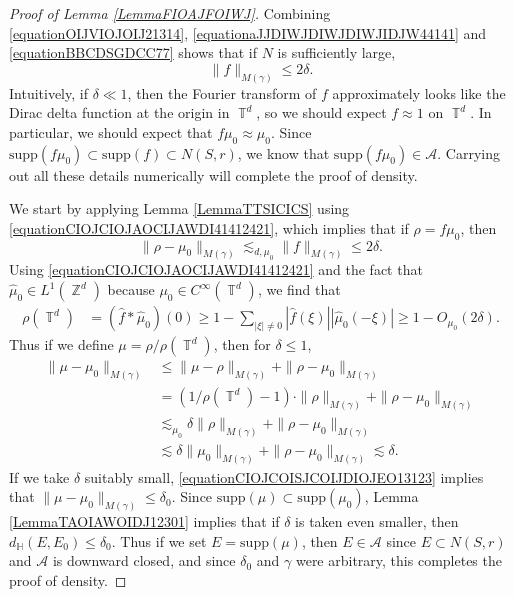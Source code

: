 \documentclass[dvipsnames,letterpaper,12pt]{article}
\numberwithin{equation}{section}
\DeclareMathOperator{\ZZ}{\mathbb{Z}}
\DeclareMathOperator{\TT}{\mathbb{T}}
\numberwithin{theorem}{section}
\begin{document}
\begin{proof}[Proof of Lemma \ref{LemmaFIOAJFOIWJ}]
    Combining \eqref{equationOIJVIOJOIJ21314}, \eqref{equationaJJDIWJDIWJDIWJIDJW44141} and \eqref{equationBBCDSGDCC77} shows that if $N$ is sufficiently large,
    \begin{equation} \label{equationCIOJCIOJAOCIJAWDI41412421}
        \| f \|_{M(\gamma)} \leq 2 \delta.
    \end{equation}
    Intuitively, if $\delta \ll 1$, then the Fourier transform of $f$ approximately looks like the Dirac delta function at the origin in $\TT^d$, so we should expect $f \approx 1$ on $\TT^d$. In particular, we should expect that $f \mu_0 \approx \mu_0$. Since $\text{supp}(f \mu_0) \subset \text{supp}(f) \subset N(S,r)$, we know that $\text{supp}(f \mu_0) \in \mathcal{A}$. Carrying out all these details numerically will complete the proof of density.

    We start by applying Lemma \ref{LemmaTTSICICS} using \eqref{equationCIOJCIOJAOCIJAWDI41412421}, which implies that if $\rho = f \mu_0$, then
    \begin{equation}
        \| \rho - \mu_0 \|_{M(\gamma)} \lesssim_{d,\mu_0} \| f \|_{M(\gamma)} \leq 2 \delta.
    \end{equation}
    Using \eqref{equationCIOJCIOJAOCIJAWDI41412421} and the fact that $\widehat{\mu}_0 \in L^1(\ZZ^d)$ because $\mu_0 \in C^\infty(\TT^d)$, we find that
    \begin{equation} \label{equationFIOJCIOWJCOIJFIO}
    \begin{split}
        \rho(\TT^d) &= (\widehat{f} * \widehat{\mu}_0)(0) \geq 1 - \sum_{|\xi| \neq 0} |\widehat{f}(\xi)| |\widehat{\mu}_0(-\xi)| \geq 1 - O_{\mu_0}(2 \delta).
    \end{split}
    \end{equation}
    Thus if we define $\mu = \rho / \rho(\TT^d)$, then for $\delta \leq 1$,
    \begin{equation} \label{equationCIOJCOISJCOIJDIOJEO13123}
    \begin{split}
        \| \mu - \mu_0 \|_{M(\gamma)} &\leq \| \mu - \rho \|_{M(\gamma)} + \| \rho - \mu_0 \|_{M(\gamma)}\\
        &= (1 / \rho(\TT^d) - 1) \cdot \| \rho \|_{M(\gamma)} + \| \rho - \mu_0 \|_{M(\gamma)}\\
        &\lesssim_{\mu_0} \delta \| \rho \|_{M(\gamma)} + \| \rho - \mu_0 \|_{M(\gamma)}\\
        &\lesssim \delta \| \mu_0 \|_{M(\gamma)} + \| \rho - \mu_0 \|_{M(\gamma)} \lesssim \delta.
    \end{split}
    \end{equation}
    If we take $\delta$ suitably small, \eqref{equationCIOJCOISJCOIJDIOJEO13123} implies that $\| \mu - \mu_0 \|_{M(\gamma)} \leq \delta_0$. Since $\text{supp}(\mu) \subset \text{supp}(\mu_0)$, Lemma \ref{LemmaTAOIAWOIDJ12301} implies that if $\delta$ is taken even smaller, then $d_{\mathbb{H}}(E, E_0) \leq \delta_0$. Thus if we set $E = \text{supp}(\mu)$, then $E \in \mathcal{A}$ since $E \subset N(S,r)$ and $\mathcal{A}$ is downward closed, and since $\delta_0$ and $\gamma$ were arbitrary, this completes the proof of density.
\end{proof}
\end{document}
